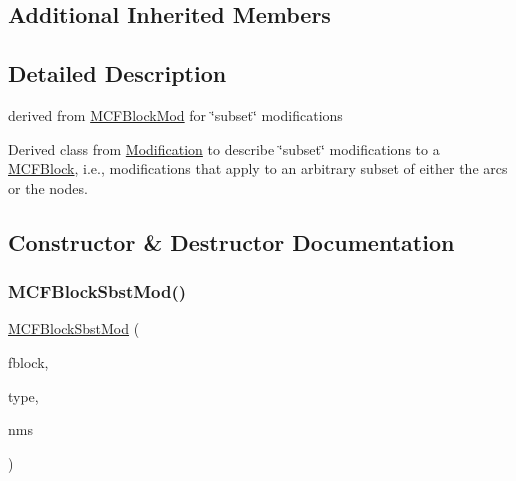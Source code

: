\subsection*{Additional Inherited Members}


\subsection{Detailed Description}
derived from \mbox{\hyperlink{class_s_m_spp__di__unipi__it_1_1_m_c_f_block_mod}{M\+C\+F\+Block\+Mod}} for \char`\"{}subset\char`\"{} modifications 

Derived class from \mbox{\hyperlink{class_s_m_spp__di__unipi__it_1_1_modification}{Modification}} to describe \char`\"{}subset\char`\"{} modifications to a \mbox{\hyperlink{class_s_m_spp__di__unipi__it_1_1_m_c_f_block}{M\+C\+F\+Block}}, i.\+e., modifications that apply to an arbitrary subset of either the arcs or the nodes. 

\subsection{Constructor \& Destructor Documentation}
\mbox{\label{class_s_m_spp__di__unipi__it_1_1_m_c_f_block_sbst_mod_ac833fbdbe3a8ad88bda257898c72d1c8}} 
\subsubsection{\texorpdfstring{M\+C\+F\+Block\+Sbst\+Mod()}{MCFBlockSbstMod()}}
{\footnotesize\ttfamily \mbox{\hyperlink{class_s_m_spp__di__unipi__it_1_1_m_c_f_block_sbst_mod}{M\+C\+F\+Block\+Sbst\+Mod}} (\begin{DoxyParamCaption}\item[{\mbox{\hyperlink{class_s_m_spp__di__unipi__it_1_1_m_c_f_block}{M\+C\+F\+Block}} $\ast$}]{fblock,  }\item[{int}]{type,  }\item[{\mbox{\hyperlink{class_s_m_spp__di__unipi__it_1_1_m_c_f_block_a9a1284953e2aa5222b5867c0a7f98499}{M\+C\+F\+Block\+::\+Vec\+\_\+\+Index}} \&\&}]{nms }\end{DoxyParamCaption})\hspace{0.3cm}{\ttfamily [inline]}}



